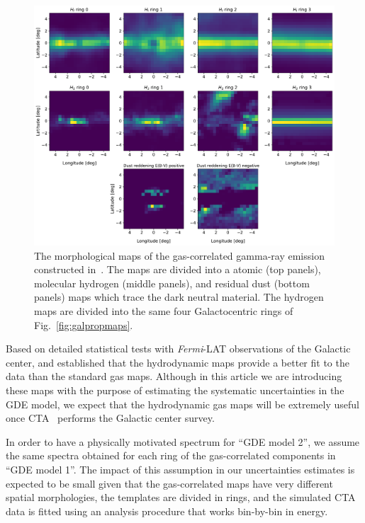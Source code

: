 \documentclass[doublespace,nopageskip]{VTthesis} %
\begin{document}
\begin{figure}[htb!]
    \centering
    \includegraphics[width=\textwidth]{Figures/CTA/maps_mis.pdf}
    \caption{The morphological maps of the gas-correlated gamma-ray emission constructed in~\citet{2018NatAs...2..387M}. The maps are divided into a atomic (top panels), molecular hydrogen (middle panels), and residual dust (bottom panels) maps which trace the dark neutral material. The hydrogen maps are divided into the same four Galactocentric rings of Fig.~\ref{fig:galpropmaps}.}
    \label{fig:hydro_maps}
\end{figure}

Based on detailed statistical tests with \textit{Fermi}-LAT observations of the Galactic center, \cite{2018NatAs...2..387M,2019JCAP...09..042M} and \cite{2020PhRvD.102b3023B} established that the hydrodynamic maps provide a better fit to the data than the standard gas maps. Although in this article we are introducing these  maps with the purpose of estimating the systematic uncertainties in the GDE model, we expect that the hydrodynamic gas maps will be extremely useful once CTA~\citep{2021JCAP...01..057A} performs the Galactic center survey.  

In order to have a physically motivated spectrum for ``GDE model 2'', we assume the same spectra obtained for each ring of the gas-correlated components in ``GDE model 1''. The impact of this assumption in our uncertainties estimates is expected to be small given that the gas-correlated maps have very different spatial morphologies, the templates are divided in rings, and the simulated CTA data is fitted using an analysis procedure that works bin-by-bin in energy. 
\end{document}
